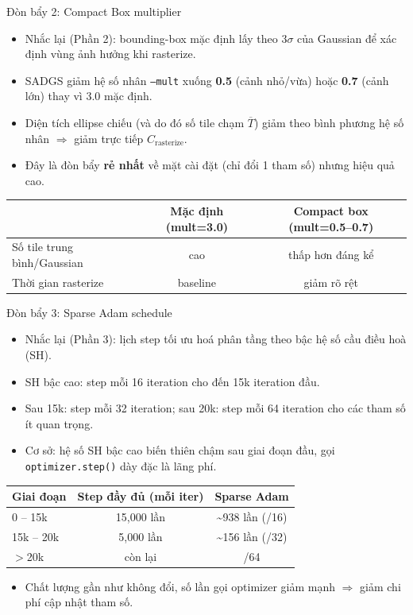 \begin{frame}{Đòn bẩy 2: Compact Box multiplier}
\begin{itemize}
    \item Nhắc lại (Phần 2): bounding-box mặc định lấy theo $3\sigma$ của Gaussian để xác định vùng ảnh hưởng khi rasterize.
    \item SADGS giảm hệ số nhân \texttt{--mult} xuống \textbf{0.5} (cảnh nhỏ/vừa) hoặc \textbf{0.7} (cảnh lớn) thay vì 3.0 mặc định.
    \item Diện tích ellipse chiếu (và do đó số tile chạm $\overline{T}$) giảm theo bình phương hệ số nhân $\Rightarrow$ giảm trực tiếp $C_{\text{rasterize}}$.
    \item Đây là đòn bẩy \textbf{rẻ nhất} về mặt cài đặt (chỉ đổi 1 tham số) nhưng hiệu quả cao.
\end{itemize}
\vspace{0.2cm}
\centering
\footnotesize
\begin{tabular}{lcc}
\toprule
& \textbf{Mặc định (mult=3.0)} & \textbf{Compact box (mult=0.5--0.7)} \\
\midrule
Số tile trung bình/Gaussian & cao & thấp hơn đáng kể \\
Thời gian rasterize & baseline & giảm rõ rệt \\
\bottomrule
\end{tabular}
\end{frame}

\begin{frame}{Đòn bẩy 3: Sparse Adam schedule}
\begin{itemize}
    \item Nhắc lại (Phần 3): lịch step tối ưu hoá phân tầng theo bậc hệ số cầu điều hoà (SH).
    \item SH bậc cao: step mỗi 16 iteration cho đến 15k iteration đầu.
    \item Sau 15k: step mỗi 32 iteration; sau 20k: step mỗi 64 iteration cho các tham số ít quan trọng.
    \item Cơ sở: hệ số SH bậc cao biến thiên chậm sau giai đoạn đầu, gọi \texttt{optimizer.step()} dày đặc là lãng phí.
\end{itemize}
\vspace{0.2cm}
\centering
\footnotesize
\begin{tabular}{lcc}
\toprule
\textbf{Giai đoạn} & \textbf{Step đầy đủ (mỗi iter)} & \textbf{Sparse Adam} \\
\midrule
0 -- 15k & 15{,}000 lần & \textasciitilde 938 lần (/16) \\
15k -- 20k & 5{,}000 lần & \textasciitilde 156 lần (/32) \\
$>$20k & còn lại & /64 \\
\bottomrule
\end{tabular}
\begin{itemize}
    \item Chất lượng gần như không đổi, số lần gọi optimizer giảm mạnh $\Rightarrow$ giảm chi phí cập nhật tham số.
\end{itemize}
\end{frame}

